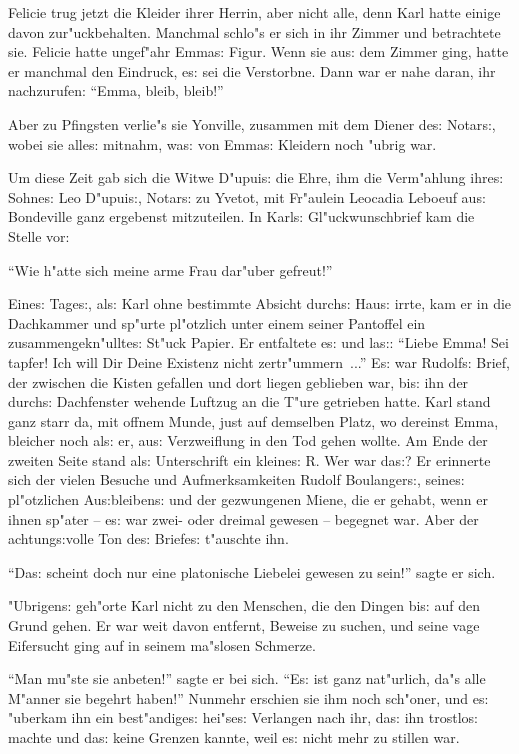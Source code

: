 \documentclass[oneside,12pt]{book}
\newcommand{\s}{s:}%
\begin{document}
Felicie trug jetzt die Kleider ihrer Herrin, aber nicht alle, denn
Karl hatte einige davon zur"uckbehalten. Manchmal schlo"s er sich
in ihr Zimmer und betrachtete sie. Felicie hatte ungef"ahr
Emma{\s} Figur. Wenn sie au{\s} dem Zimmer ging, hatte er manchmal
den Eindruck, e{\s} sei die Verstorbne. Dann war er nahe daran,
ihr nachzurufen: "`Emma, bleib, bleib!"'

Aber zu Pfingsten verlie"s sie Yonville, zusammen mit dem Diener
de{\s} Notar{\s}, wobei sie alle{\s} mitnahm, wa{\s} von Emma{\s}
Kleidern noch "ubrig war.

Um diese Zeit gab sich die Witwe D"upui{\s} die Ehre, ihm die
Verm"ahlung ihre{\s} Sohne{\s} Leo D"upui{\s}, Notar{\s} zu
Yvetot, mit Fr"aulein Leocadia Leboeuf au{\s} Bondeville ganz
ergebenst mit\/zuteilen. In Karl{\s} Gl"uckwunschbrief kam die
Stelle vor:

"`Wie h"atte sich meine arme Frau dar"uber gefreut!"'

Eine{\s} Tage{\s}, al{\s} Karl ohne bestimmte Absicht durch{\s}
Hau{\s} irrte, kam er in die Dachkammer und sp"urte pl"otzlich
unter einem seiner Pantoffel ein zusammengekn"ullte{\s} St"uck
Papier. Er entfaltete e{\s} und la{\s}: "`Liebe Emma! Sei tapfer!
Ich will Dir Deine Existenz nicht zertr"ummern~..."' E{\s} war
Rudolf{\s} Brief, der zwischen die Kisten gefallen und dort liegen
geblieben war, bi{\s} ihn der durch{\s} Dachfenster wehende
Luft\/zug an die T"ure getrieben hatte. Karl stand ganz starr da,
mit offnem Munde, just auf demselben Platz, wo dereinst Emma,
bleicher noch al{\s} er, au{\s} Verzweiflung in den Tod gehen
wollte. Am Ende der zweiten Seite stand al{\s} Unterschrift ein
kleine{\s} R. Wer war da{\s}? Er erinnerte sich der vielen Besuche
und Aufmerksamkeiten Rudolf Boulanger{\s}, seine{\s} pl"otzlichen
Au{\s}bleiben{\s} und der gezwungenen Miene, die er gehabt, wenn
er ihnen sp"ater -- e{\s} war zwei- oder dreimal gewesen --
begegnet war. Aber der achtung{\s}volle Ton de{\s} Briefe{\s}
t"auschte ihn.

"`Da{\s} scheint doch nur eine platonische Liebelei gewesen zu
sein!"' sagte er sich.

"Ubrigen{\s} geh"orte Karl nicht zu den Menschen, die den Dingen
bi{\s} auf den Grund gehen. Er war weit davon entfernt, Beweise zu
suchen, und seine vage Eifersucht ging auf in seinem ma"slosen
Schmerze.

"`Man mu"ste sie anbeten!"' sagte er bei sich. "`E{\s} ist ganz
nat"urlich, da"s alle M"anner sie begehrt haben!"' Nunmehr
erschien sie ihm noch sch"oner, und e{\s} "uberkam ihn ein
best"andige{\s} hei"se{\s} Verlangen nach ihr, da{\s} ihn
trostlo{\s} machte und da{\s} keine Grenzen kannte, weil e{\s}
nicht mehr zu stillen war.
\end{document}
